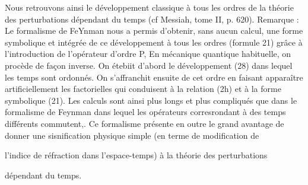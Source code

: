 %

Nous retrouvons ainsi le développement classique à tous les
ordres de la théorie des perturbations dépendant du temps (cf Messiah, tome II,
p. 620).
Remarque :
Le formalisme de FeYnman nous a permis d'obtenir, sans aucun calcul, une
forme symbolique et intégrée de ce développement à tous les ordres (formule 21)
grâce à l'introduction de l'opérateur d'ordre P,
En mécanique quantique habituelle, on procède de façon inverse.
On étebiit d'abord le développement (28) dans lequel les temps 
sont ordonnés. On s'affranchit ensuite de cet ordre en faisant apparaître artificiellement les factorielles qui conduisent à la relation (2h) et à la
forme symbolique (21).
Les calculs sont ainsi plus longs et plus compliqués que dans
le formalisme de Feynman dans lequel les opérateurs corresrondant à des temps
différents commutent,. Ce formalisme présente en outre le grand avantage de
donner une sisnification physique simple (en terme de modification de

l'indice de réfraction dans l'espace-temps) à la théorie des perturbations

dépendant du temps.

